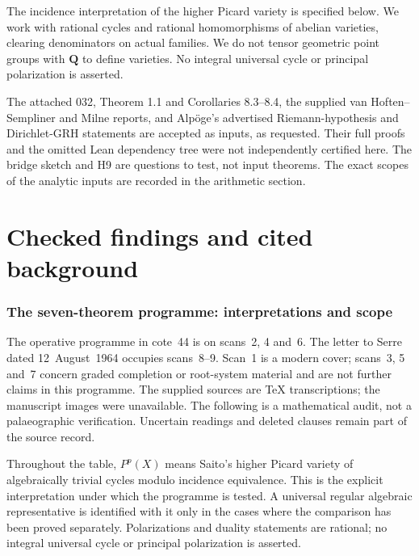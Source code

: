 \documentclass[11pt,a4paper]{article}
\begin{document}
The incidence interpretation of the higher Picard variety is specified
below. We work with rational cycles and rational homomorphisms of
abelian varieties, clearing denominators on actual families. We do not
tensor geometric point groups with $\mathbf Q$ to define varieties.
No integral universal cycle or principal polarization is asserted.

The attached 032, Theorem 1.1 and Corollaries 8.3--8.4, the supplied
van Hoften--Sempliner and Milne reports, and Alp\"oge's advertised
Riemann-hypothesis and Dirichlet-GRH statements are accepted as inputs,
as requested. Their full proofs and the omitted Lean dependency tree
were not independently certified here. The bridge sketch and H9 are
questions to test, not input theorems. The exact scopes of the analytic
inputs are recorded in the arithmetic section.

\part{Checked findings and cited background}

\section{The seven-theorem programme: interpretations and scope}
\label{sec:programme-overview}

The operative programme in cote~44 is on scans~2, 4 and~6.
The letter to Serre dated 12~August~1964 occupies scans~8--9.
Scan~1 is a modern cover; scans~3, 5 and~7 concern graded
completion or root-system material and are not further claims in
this programme. The supplied sources are TeX transcriptions;
the manuscript images were unavailable. The following is a
mathematical audit, not a palaeographic verification. Uncertain
readings and deleted clauses remain part of the source record.

Throughout the table, $P^p(X)$ means Saito's higher Picard variety
of algebraically trivial cycles modulo incidence equivalence.
This is the explicit interpretation under which the programme is
tested. A universal regular algebraic representative is identified
with it only in the cases where the comparison has been proved
separately. Polarizations and duality statements are rational;
no integral universal cycle or principal polarization is asserted.
\end{document}
